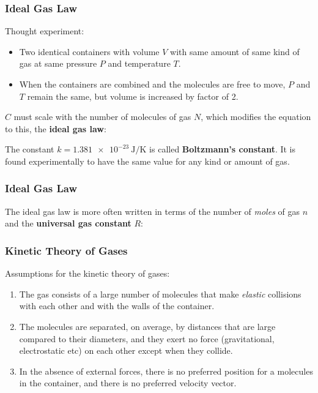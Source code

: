 \documentclass[12pt,aspectratio=169]{beamer}
\newcommand{\eq}[2]{\vspace{#1}{\Large\begin{displaymath}#2\end{displaymath}}}
\begin{document}
\begin{frame}
  \frametitle{Ideal Gas Law}
  Thought experiment:
  \begin{itemize}
  \item Two identical containers with volume $V$ with same amount of same kind
    of gas at same pressure $P$ and temperature $T$.
  \item When the containers are combined and the molecules are free to
    move, $P$ and $T$ remain the same, but volume is increased by factor of 2.
  \end{itemize}

  $C$ must scale with the number of molecules of gas $N$, which modifies the
  equation to this, the \textbf{ideal gas law}:

  \eq{-.25in}{
    \boxed{PV=NkT}
  }

  \vspace{-.15in}The constant $k=\SI{1.381e-23}{\joule/\kelvin}$ is called
  \textbf{Boltzmann's constant}. It is found experimentally to have the same
  value for any kind or amount of gas.
\end{frame}



\begin{frame}
  \frametitle{Ideal Gas Law}
  The ideal gas law is more often written in terms of the number of
  \emph{moles} of gas $n$ and the \textbf{universal gas constant} $R$:
  
  \eq{-.2in}{
    \boxed{PV=nRT}
  }
\end{frame}


\begin{frame}
  \frametitle{Kinetic Theory of Gases}
  Assumptions for the kinetic theory of gases:
  \begin{enumerate}
  \item The gas consists of a large number of molecules that make
    \emph{elastic} collisions with each other and with the walls of the
    container.
  \item The molecules are separated, on average, by distances that are large
    compared to their diameters, and they exert no force (gravitational,
    electrostatic etc) on each other except when they collide.
  \item In the absence of external forces, there is no preferred position for a
    molecules in the container, and there is no preferred velocity vector.
  \end{enumerate}
\end{frame}
\end{document}

